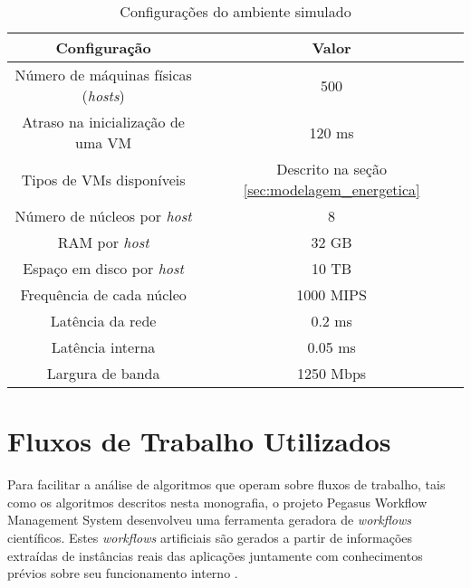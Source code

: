 \begin{table}
	\centering
    \begin{tabular}{c|c}
    \hline
    \textbf{Configuração}                     & \textbf{Valor}                                   \\ \hline
    Número de máquinas físicas (\emph{hosts}) & 500                                              \\
    Atraso na inicialização de uma VM         & 120 ms                                           \\
    Tipos de VMs disponíveis                  & Descrito na seção \ref{sec:modelagem_energetica} \\
    Número de núcleos por \emph{host}         & 8                                                \\
    RAM por \emph{host}                       & 32 GB                                            \\
    Espaço em disco por \emph{host}           & 10 TB                                            \\
    Frequência de cada núcleo                 & 1000 MIPS                                        \\
    Latência da rede                          & 0.2 ms                                           \\
    Latência interna                          & 0.05 ms                                          \\
    Largura de banda                          & 1250 Mbps                                        \\ \hline
    \end{tabular}
    \caption{Configurações do ambiente simulado}
    \label{tab:configuracoes_cloudsim_dvfs}
\end{table}


\section{Fluxos de Trabalho Utilizados}
\label{sec:fluxos_trabalho}

Para facilitar a análise de algoritmos que operam sobre fluxos de trabalho,
tais como os algoritmos descritos nesta monografia, o projeto Pegasus Workflow
Management System desenvolveu uma ferramenta geradora de \emph{workflows}
científicos. Estes \emph{workflows} artificiais são gerados a partir de
informações extraídas de instâncias reais das aplicações juntamente com
conhecimentos prévios sobre seu funcionamento interno
\cite{pegasus:workflowgenerator}. 

